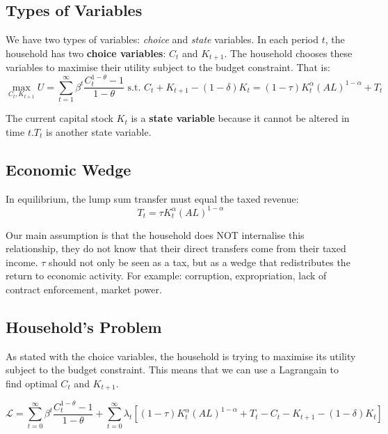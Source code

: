 \documentclass[11pt]{article}
\begin{document}
\subsection{Types of Variables}

We have two types of variables: \textit{choice} and \textit{state} variables. In each period $t$, the household has two \textbf{choice variables}: $C_t$ and $K_{t+1}$. The household chooses these variables to maximise their utility subject to the budget constraint. That is:
\[\mathop{max}_{C_t, K_{t+1}} U = \sum_{t=1}^\infty \beta^t \dfrac{C_t^{1-\theta}-1}{1-\theta} \text { s.t. } C_t + K_{t+1} - (1-\delta)K_t = (1-\tau)K_t^\alpha(AL)^{1-\alpha} + T_t\]

The current capital stock $K_t$ is a \textbf{state variable} because it cannot be altered in time $t$.$T_t$ is another state variable.

\subsection{Economic Wedge}

In equilibrium, the lump sum transfer must equal the taxed revenue:
\[T_t = \tau K_t^\alpha(AL)^{1-\alpha}\]

Our main assumption is that the household does NOT internalise this relationship, they do not know that their direct transfers come from their taxed income. $\tau$ should not only be seen as a tax, but as a wedge that redistributes the return to economic activity. For example: corruption, expropriation, lack of contract enforcement, market power.

\subsection{Household's Problem}

As stated with the choice variables, the household is trying to maximise its utility subject to the budget constraint. This means that we can use a Lagrangain to find optimal $C_t$ and $K_{t+1}$.

\begin{shaded}
    \begin{equation}
\label{lagrange}
    \mathcal{L} = \sum_{t=0}^\infty \beta^t \dfrac{C_t^{1-\theta}-1}{1-\theta} + \sum_{t=0}^\infty \lambda_t \left[ (1-\tau)K_{t}^{\alpha}(AL)^{1-\alpha} + T_t - C_t - K_{t+1} - (1-\delta)K_t\right]
\end{equation}
\end{shaded}
\end{document}
